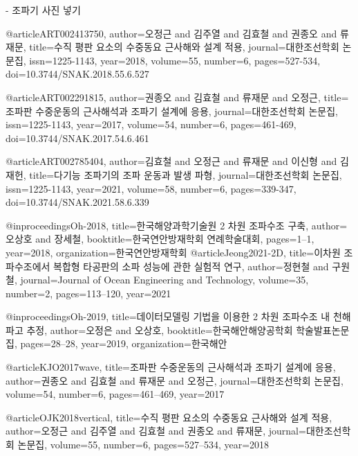 




- 조파기 사진 넣기

@article{ART002413750,
author={오정근 and 김주열 and 김효철 and 권종오 and 류재문},
title={수직 평판 요소의 수중동요 근사해와 설계 적용},
journal={대한조선학회 논문집},
issn={1225-1143},
year={2018},
volume={55},
number={6},
pages={527-534},
doi={10.3744/SNAK.2018.55.6.527}
}

@article{ART002291815,
author={권종오 and 김효철 and 류재문 and 오정근},
title={조파판 수중운동의 근사해석과 조파기 설계에 응용},
journal={대한조선학회 논문집},
issn={1225-1143},
year={2017},
volume={54},
number={6},
pages={461-469},
doi={10.3744/SNAK.2017.54.6.461}
}

@article{ART002785404,
author={김효철 and 오정근 and 류재문 and 이신형 and 김재헌},
title={다기능 조파기의 조파 운동과 발생 파형},
journal={대한조선학회 논문집},
issn={1225-1143},
year={2021},
volume={58},
number={6},
pages={339-347},
doi={10.3744/SNAK.2021.58.6.339}
}

@inproceedings{Oh-2018,
  title={한국해양과학기술원 2 차원 조파수조 구축},
  author={오상호 and 장세철},
  booktitle={한국연안방재학회 연례학술대회},
  pages={1--1},
  year={2018},
  organization={한국연안방재학회}
}
@article{Jeong2021-2D,
  title={이차원 조파수조에서 복합형 타공판의 소파 성능에 관한 실험적 연구},
  author={정현철 and 구원철},
  journal={Journal of Ocean Engineering and Technology},
  volume={35},
  number={2},
  pages={113--120},
  year={2021}
}

@inproceedings{Oh-2019,
  title={데이터모델링 기법을 이용한 2 차원 조파수조 내 천해 파고 추정},
  author={오정은 and 오상호},
  booktitle={한국해안해양공학회 학술발표논문집},
  pages={28--28},
  year={2019},
  organization={한국해안}
}

@article{KJO2017wave,
  title={조파판 수중운동의 근사해석과 조파기 설계에 응용},
  author={권종오 and 김효철 and 류재문 and 오정근},
  journal={대한조선학회 논문집},
  volume={54},
  number={6},
  pages={461--469},
  year={2017}
}

@article{OJK2018vertical,
  title={수직 평판 요소의 수중동요 근사해와 설계 적용},
  author={오정근 and 김주열 and 김효철 and 권종오 and 류재문},
  journal={대한조선학회 논문집},
  volume={55},
  number={6},
  pages={527--534},
  year={2018}
}